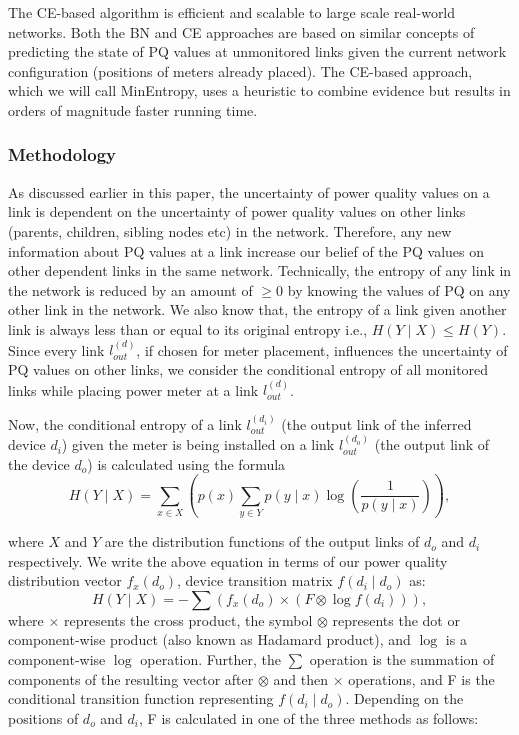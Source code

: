 The CE-based algorithm is efficient and scalable to large scale real-world networks. Both the BN and CE approaches are based on similar concepts of predicting the state of PQ values at unmonitored links given the current network configuration (positions of meters already placed). The CE-based approach, which we will call MinEntropy, uses a heuristic to combine evidence but results in orders of magnitude faster running time.

\subsubsection{Methodology}
As discussed earlier in this paper, the uncertainty of power quality values on a link is dependent on the uncertainty of power quality values on other links (parents, children, sibling nodes etc) in the network. Therefore, any new information about PQ values at a link increase our belief of the PQ values on other dependent links in the same network. Technically, the entropy of any link in the network is reduced by an amount of $\ge0$ by knowing the values of PQ on any other link in the network. We also know that, the entropy of a link given another link is always less than or equal to its original entropy i.e., $H(Y \mid X) \leq H(Y)$. Since every link $l_{out}^{(d)}$, if chosen for meter placement, influences the uncertainty of PQ values on other links, we consider the conditional entropy of all monitored links while placing power meter at a link $l_{out}^{(d)}$.

Now, the conditional entropy of a link $l_{out}^{(d_i)}$ (the output link of the inferred device $d_i$) given the meter is being installed on a link $l_{out}^{(d_o)}$ (the output link of the device $d_o$) is calculated using the formula \[H(Y \mid X) = \sum_{x \in X} \left( p(x) \sum_{y \in Y} p(y \mid x) \log (\frac{1}{p(y \mid x)})\right),\]

\noindent where $X$ and $Y$ are the distribution functions of the output links of $d_o$ and $d_i$ respectively. We write the above equation in terms of our power quality distribution vector $f_x(d_o)$, device transition matrix $f(d_i \mid d_o)$ as:
\[H(Y \mid X) = - \sum \left( f_x(d_o) \times \left(F \otimes \log f(d_i)\right)  \right), \]
\noindent where $\times$ represents the cross product, the symbol $\otimes$ represents the dot or component-wise product (also known as Hadamard product), and $\log$ is a component-wise $\log$ operation. Further, the $\sum$ operation is the summation of components of the resulting vector after $\otimes$ and then $\times$ operations, and F is the conditional transition function representing $f(d_i \mid d_o)$.  Depending on the positions of $d_o$ and $d_i$, F is calculated in one of the three methods as follows:


